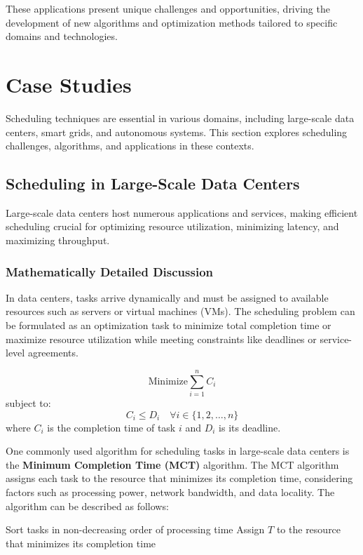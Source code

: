 \documentclass[12pt]{book} %
\begin{document}
These applications present unique challenges and opportunities, driving the development of new algorithms and optimization methods tailored to specific domains and technologies.


\section{Case Studies}
Scheduling techniques are essential in various domains, including large-scale data centers, smart grids, and autonomous systems. This section explores scheduling challenges, algorithms, and applications in these contexts.

\subsection{Scheduling in Large-Scale Data Centers}
Large-scale data centers host numerous applications and services, making efficient scheduling crucial for optimizing resource utilization, minimizing latency, and maximizing throughput. 

\subsubsection{Mathematically Detailed Discussion}
In data centers, tasks arrive dynamically and must be assigned to available resources such as servers or virtual machines (VMs). The scheduling problem can be formulated as an optimization task to minimize total completion time or maximize resource utilization while meeting constraints like deadlines or service-level agreements.

\[
\text{Minimize} \sum_{i=1}^{n} C_i
\]
subject to:
\[
C_i \leq D_i \quad \forall i \in \{1, 2, \ldots, n\}
\]
where \(C_i\) is the completion time of task \(i\) and \(D_i\) is its deadline.


One commonly used algorithm for scheduling tasks in large-scale data centers is the \textbf{Minimum Completion Time (MCT)} algorithm. The MCT algorithm assigns each task to the resource that minimizes its completion time, considering factors such as processing power, network bandwidth, and data locality. The algorithm can be described as follows:
\FloatBarrier
\begin{algorithm}[H]
\caption{Minimum Completion Time (MCT) Algorithm}
\begin{algorithmic}[1]
\State Sort tasks in non-decreasing order of processing time
\State Assign $T$ to the resource that minimizes its completion time
\EndFor
\end{algorithmic}
\end{algorithm}
\end{document}
